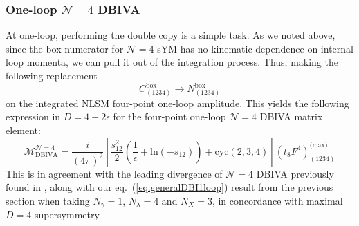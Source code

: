 \documentclass[11pt,letter]{article}
\def\eqn#1{eq.~(\ref{#1})}
\begin{document}
\subsubsection{One-loop $\mathcal{N}=4$ DBIVA} \label{sec:DBIvDC1loop}
At one-loop, performing the double copy is a simple task. As we noted above, since the box numerator for $\mathcal{N}=4$ sYM has no kinematic dependence on internal loop momenta, we can pull it out of the integration process. Thus, making the following replacement 
\begin{equation}
C^{\text{box}}_{(1234)} \rightarrow N^{\text{box}}_{(1234)}
\end{equation}
on the integrated NLSM four-point one-loop amplitude. This yields the following expression in $D=4-2\epsilon$ for the four-point one-loop $\mathcal{N}=4$ DBIVA matrix element:
\begin{equation}
\mathcal{M}^{\mathcal{N}=4}_{\text{DBIVA}} = \frac{i}{(4\pi)^2}\left[\frac{s_{12}^2}{2}\left(\frac{1}{\epsilon} +\text{ln}(-s_{12})\right)+\text{cyc}(2,3,4)\right](t_8F^4)^{\text{(max)}}_{(1234)} 
\end{equation}
This is in agreement with the leading divergence of $\mathcal{N}=4$ DBIVA previously found in \cite{Elvang:2020kuj}, along with our \eqn{eq:generalDBI1loop} result from the previous section when taking $N_\gamma =1$, $N_\lambda=4$ and $N_X=3$, in concordance with maximal $D=4$ supersymmetry 
\end{document}
